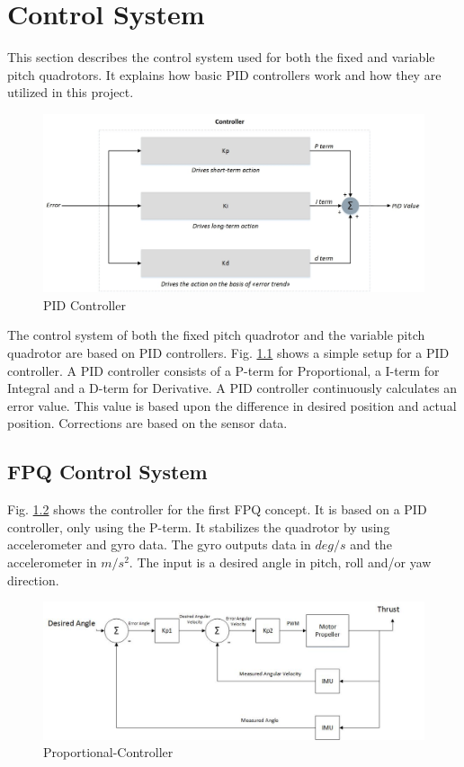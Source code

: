 \chapter{Control System}
This section describes the control system used for both the fixed and variable pitch quadrotors. It explains how basic PID controllers work and how they are utilized in this project. \bigskip
\begin{figure}[H]
          \centering
            \includegraphics[scale = 0.7]{VAPIQ-PICTURES/pid.jpg}
            \caption{PID Controller}
            \label{fig:pid}
\end{figure}
The control system of both the fixed pitch quadrotor and the variable pitch quadrotor are based on PID controllers. Fig. \ref{fig:pid} shows a simple setup for a PID controller. A PID controller consists of a P-term for Proportional, a I-term for Integral and a D-term for Derivative. A PID controller continuously calculates an error value. This value is based upon the difference in desired position and actual position. Corrections are based on the sensor data.

\section{FPQ Control System}
Fig. \ref{fig:dir} shows the controller for the first FPQ concept. It is based on a PID controller, only using the P-term. It stabilizes the quadrotor by using accelerometer and gyro data. The gyro outputs data in $deg/s$ and the accelerometer in $m/s^2$. The input is a desired angle in pitch, roll and/or yaw direction.
\begin{figure}[H]
          \centering
            \includegraphics[scale = 0.5]{VAPIQ-PICTURES/CSBD.jpg}
                \caption{Proportional-Controller}
            \label{fig:dir}
\end{figure} 

